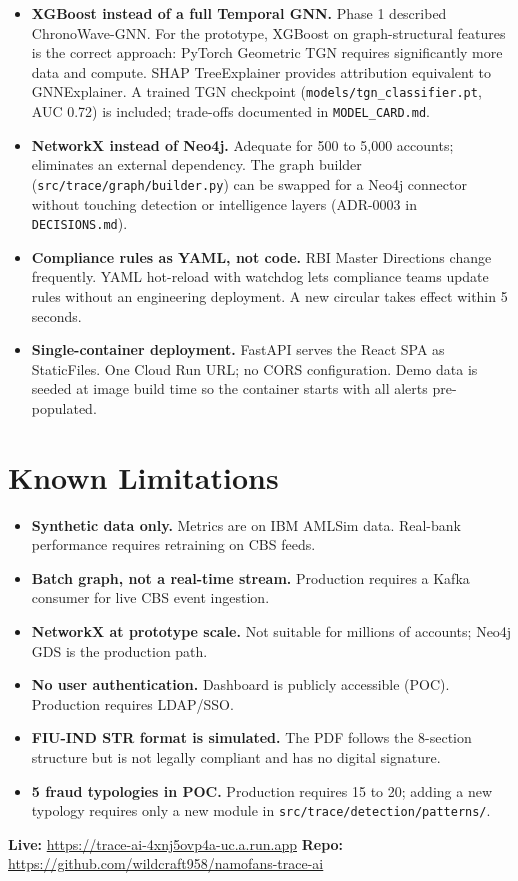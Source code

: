\documentclass[10pt,a4paper]{article}
\begin{document}
\begin{itemize}
  \item \textbf{XGBoost instead of a full Temporal GNN.} Phase 1 described ChronoWave-GNN. For the prototype, XGBoost on graph-structural features is the correct approach: PyTorch Geometric TGN requires significantly more data and compute. SHAP TreeExplainer provides attribution equivalent to GNNExplainer. A trained TGN checkpoint (\texttt{models/tgn\_classifier.pt}, AUC 0.72) is included; trade-offs documented in \texttt{MODEL\_CARD.md}.
  \item \textbf{NetworkX instead of Neo4j.} Adequate for 500 to 5,000 accounts; eliminates an external dependency. The graph builder (\texttt{src/trace/graph/builder.py}) can be swapped for a Neo4j connector without touching detection or intelligence layers (ADR-0003 in \texttt{DECISIONS.md}).
  \item \textbf{Compliance rules as YAML, not code.} RBI Master Directions change frequently. YAML hot-reload with watchdog lets compliance teams update rules without an engineering deployment. A new circular takes effect within 5 seconds.
  \item \textbf{Single-container deployment.} FastAPI serves the React SPA as StaticFiles. One Cloud Run URL; no CORS configuration. Demo data is seeded at image build time so the container starts with all alerts pre-populated.
\end{itemize}

\section{Known Limitations}

\begin{itemize}
  \item \textbf{Synthetic data only.} Metrics are on IBM AMLSim data. Real-bank performance requires retraining on CBS feeds.
  \item \textbf{Batch graph, not a real-time stream.} Production requires a Kafka consumer for live CBS event ingestion.
  \item \textbf{NetworkX at prototype scale.} Not suitable for millions of accounts; Neo4j GDS is the production path.
  \item \textbf{No user authentication.} Dashboard is publicly accessible (POC). Production requires LDAP/SSO.
  \item \textbf{FIU-IND STR format is simulated.} The PDF follows the 8-section structure but is not legally compliant and has no digital signature.
  \item \textbf{5 fraud typologies in POC.} Production requires 15 to 20; adding a new typology requires only a new module in \texttt{src/trace/detection/patterns/}.
\end{itemize}

\vspace{4mm}
\noindent\colorbox{traceblue!8}{\parbox{\dimexpr\linewidth-10pt\relax}{\footnotesize\color{traceblue}\sloppy
\textbf{Live:} \url{https://trace-ai-4xnj5ovp4a-uc.a.run.app} \quad
\textbf{Repo:} \url{https://github.com/wildcraft958/namofans-trace-ai}
}}
\end{document}
